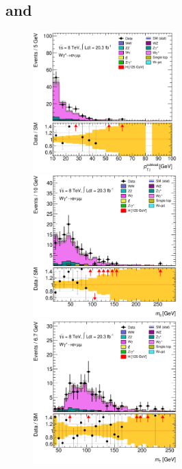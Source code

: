 \subsection{\WZ and \Wgstar}
\label{sec:diboson:wgstar}


\begin{figure}[p]
	\includegraphics[width=0.495\textwidth]{tex/backgrounds/Wgstar/em_CutDPhiMax_lepPtSublead_zoom_mh125_lin}
	\hfill
	\includegraphics[width=0.495\textwidth]{tex/backgrounds/Wgstar/em_CutDPhiMax_Mll_mh125_lin}
	\\
	\includegraphics[width=0.495\textwidth]{tex/backgrounds/Wgstar/em_CutDPhiMax_MT_TrackHWW_Clj_mh125_lin}

\end{figure}
